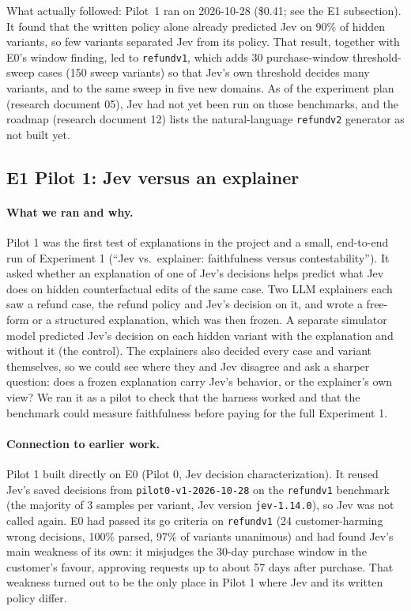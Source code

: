 \documentclass[11pt]{article}
\renewcommand{\_}{\origunderscore\allowbreak}
\begin{document}
What actually followed: Pilot~1 ran on 2026-10-28 (\$0.41; see the E1 subsection). It found that the written policy alone already predicted Jev on 90\% of hidden variants, so few variants separated Jev from its policy. That result, together with E0's window finding, led to \texttt{refund\_v1\_1}, which adds 30 purchase-window threshold-sweep cases (150 sweep variants) so that Jev's own threshold decides many variants, and to the same sweep in five new domains. As of the experiment plan (research document 05), Jev had not yet been run on those benchmarks, and the roadmap (research document 12) lists the natural-language \texttt{refund\_v2} generator as not built yet.

\subsection{E1 Pilot 1: Jev versus an explainer}\label{sec:e1p1}

\paragraph{What we ran and why.}
Pilot 1 was the first test of explanations in the project and a small, end-to-end run of Experiment 1 (``Jev vs.\ explainer: faithfulness versus contestability''). It asked whether an explanation of one of Jev's decisions helps predict what Jev does on hidden counterfactual edits of the same case. Two LLM explainers each saw a refund case, the refund policy and Jev's decision on it, and wrote a free-form or a structured explanation, which was then frozen. A separate simulator model predicted Jev's decision on each hidden variant with the explanation and without it (the control). The explainers also decided every case and variant themselves, so we could see where they and Jev disagree and ask a sharper question: does a frozen explanation carry Jev's behavior, or the explainer's own view? We ran it as a pilot to check that the harness worked and that the benchmark could measure faithfulness before paying for the full Experiment 1.

\paragraph{Connection to earlier work.}
Pilot 1 built directly on E0 (Pilot 0, Jev decision characterization). It reused Jev's saved decisions from \texttt{pilot0-v1-2026-10-28} on the \texttt{refund\_v1} benchmark (the majority of 3 samples per variant, Jev version \texttt{jev-1.14.0}), so Jev was not called again. E0 had passed its go criteria on \texttt{refund\_v1} (24 customer-harming wrong decisions, 100\% parsed, 97\% of variants unanimous) and had found Jev's main weakness of its own: it misjudges the 30-day purchase window in the customer's favour, approving requests up to about 57 days after purchase. That weakness turned out to be the only place in Pilot 1 where Jev and its written policy differ.
\end{document}
